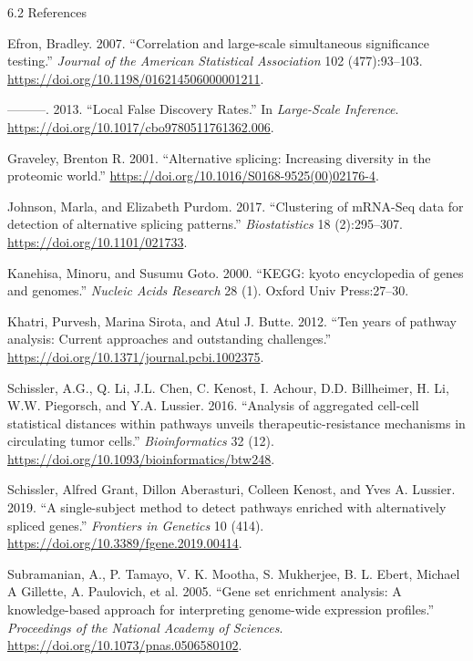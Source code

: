 \documentclass[ignorenonframetext,aspectratio=169,]{beamer}
\begin{document}
\begin{frame}[allowframebreaks]{%
\protect\hypertarget{references}{%
6.2 References}}

\hypertarget{refs}{}
\leavevmode\hypertarget{ref-Efron2007a}{}%
Efron, Bradley. 2007. “Correlation and large-scale simultaneous
significance testing.” \emph{Journal of the American Statistical
Association} 102 (477):93–103.
\url{https://doi.org/10.1198/016214506000001211}.

\leavevmode\hypertarget{ref-Efron2013}{}%
———. 2013. “Local False Discovery Rates.” In \emph{Large-Scale
Inference}. \url{https://doi.org/10.1017/cbo9780511761362.006}.

\leavevmode\hypertarget{ref-Graveley2001}{}%
Graveley, Brenton R. 2001. “Alternative splicing: Increasing diversity
in the proteomic world.”
\url{https://doi.org/10.1016/S0168-9525(00)02176-4}.

\leavevmode\hypertarget{ref-Johnson2017}{}%
Johnson, Marla, and Elizabeth Purdom. 2017. “Clustering of mRNA-Seq data
for detection of alternative splicing patterns.” \emph{Biostatistics} 18
(2):295–307. \url{https://doi.org/10.1101/021733}.

\leavevmode\hypertarget{ref-kanehisa2000kegg}{}%
Kanehisa, Minoru, and Susumu Goto. 2000. “KEGG: kyoto encyclopedia of
genes and genomes.” \emph{Nucleic Acids Research} 28 (1). Oxford Univ
Press:27–30.

\leavevmode\hypertarget{ref-Khatri2012n1pas}{}%
Khatri, Purvesh, Marina Sirota, and Atul J. Butte. 2012. “Ten years of
pathway analysis: Current approaches and outstanding challenges.”
\url{https://doi.org/10.1371/journal.pcbi.1002375}.

\leavevmode\hypertarget{ref-Schissler2016a}{}%
Schissler, A.G., Q. Li, J.L. Chen, C. Kenost, I. Achour, D.D.
Billheimer, H. Li, W.W. Piegorsch, and Y.A. Lussier. 2016. “Analysis of
aggregated cell-cell statistical distances within pathways unveils
therapeutic-resistance mechanisms in circulating tumor cells.”
\emph{Bioinformatics} 32 (12).
\url{https://doi.org/10.1093/bioinformatics/btw248}.

\leavevmode\hypertarget{ref-Schissler2019}{}%
Schissler, Alfred Grant, Dillon Aberasturi, Colleen Kenost, and Yves A.
Lussier. 2019. “A single-subject method to detect pathways enriched with
alternatively spliced genes.” \emph{Frontiers in Genetics} 10 (414).
\url{https://doi.org/10.3389/fgene.2019.00414}.

\leavevmode\hypertarget{ref-Subramanian2005}{}%
Subramanian, A., P. Tamayo, V. K. Mootha, S. Mukherjee, B. L. Ebert,
Michael A Gillette, A. Paulovich, et al. 2005. “Gene set enrichment
analysis: A knowledge-based approach for interpreting genome-wide
expression profiles.” \emph{Proceedings of the National Academy of
Sciences}. \url{https://doi.org/10.1073/pnas.0506580102}.

\end{frame}
\end{document}
